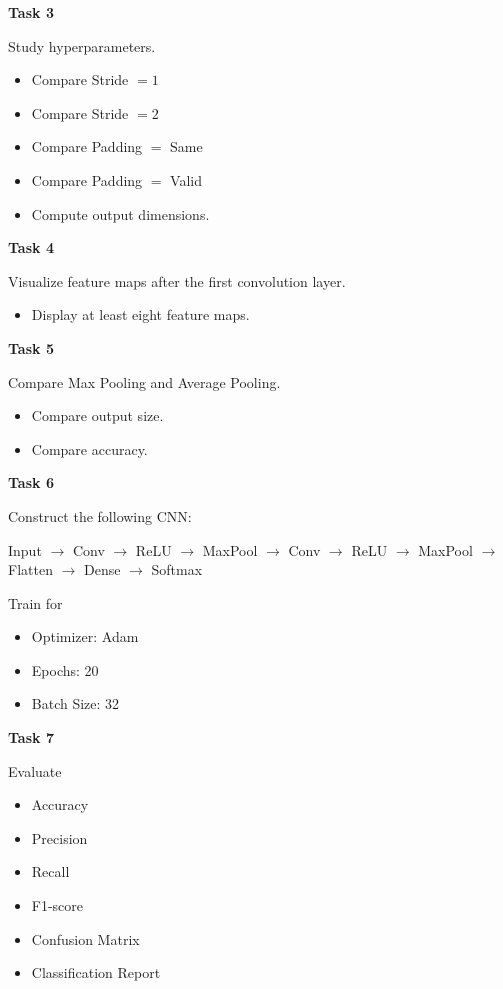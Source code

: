 \documentclass[11pt]{article}
\begin{document}
\vspace{4mm}
\textbf{Task 3}

Study hyperparameters.
\begin{itemize}
\item Compare Stride $=1$
\item Compare Stride $=2$
\item Compare Padding $=$ Same
\item Compare Padding $=$ Valid
\item Compute output dimensions.
\end{itemize}

\vspace{4mm}
\textbf{Task 4}

Visualize feature maps after the first convolution layer.
\begin{itemize}
\item Display at least eight feature maps.
\end{itemize}

\vspace{4mm}
\textbf{Task 5}

Compare Max Pooling and Average Pooling.
\begin{itemize}
\item Compare output size.
\item Compare accuracy.
\end{itemize}

\vspace{4mm}
\textbf{Task 6}

Construct the following CNN:

\begin{center}
Input $\rightarrow$ Conv $\rightarrow$ ReLU $\rightarrow$ MaxPool $\rightarrow$ Conv $\rightarrow$ ReLU $\rightarrow$ MaxPool $\rightarrow$ Flatten $\rightarrow$ Dense $\rightarrow$ Softmax
\end{center}

Train for
\begin{itemize}
\item Optimizer: Adam
\item Epochs: 20
\item Batch Size: 32
\end{itemize}

\vspace{4mm}
\textbf{Task 7}

Evaluate
\begin{itemize}
\item Accuracy
\item Precision
\item Recall
\item F1-score
\item Confusion Matrix
\item Classification Report
\end{itemize}
\end{document}
